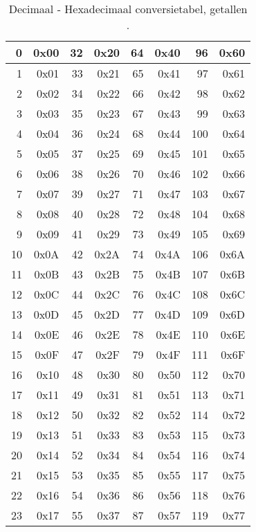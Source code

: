 \begin{table}[h!]
\caption{Decimaal - Hexadecimaal conversietabel, getallen .}
\label{tab:hexconv1}
\renewcommand{\arraystretch}{1.0}
\centering
\ttfamily
\begin{tabular}{|>{\color{red}}rr||>{\color{red}}rr||>{\color{red}}rr||>{\color{red}}rr|}
\hline
0 & 0x00 & 32 & 0x20 & 64 & 0x40 & 96 & 0x60 \\
\hline
1 & 0x01 & 33 & 0x21 & 65 & 0x41 & 97 & 0x61 \\
\hline
2 & 0x02 & 34 & 0x22 & 66 & 0x42 & 98 & 0x62 \\
\hline
3 & 0x03 & 35 & 0x23 & 67 & 0x43 & 99 & 0x63 \\
\hline
4 & 0x04 & 36 & 0x24 & 68 & 0x44 & 100 & 0x64 \\
\hline
5 & 0x05 & 37 & 0x25 & 69 & 0x45 & 101 & 0x65 \\
\hline
6 & 0x06 & 38 & 0x26 & 70 & 0x46 & 102 & 0x66 \\
\hline
7 & 0x07 & 39 & 0x27 & 71 & 0x47 & 103 & 0x67 \\
\hline
8 & 0x08 & 40 & 0x28 & 72 & 0x48 & 104 & 0x68 \\
\hline
9 & 0x09 & 41 & 0x29 & 73 & 0x49 & 105 & 0x69 \\
\hline
10 & 0x0A & 42 & 0x2A & 74 & 0x4A & 106 & 0x6A \\
\hline
11 & 0x0B & 43 & 0x2B & 75 & 0x4B & 107 & 0x6B \\
\hline
12 & 0x0C & 44 & 0x2C & 76 & 0x4C & 108 & 0x6C \\
\hline
13 & 0x0D & 45 & 0x2D & 77 & 0x4D & 109 & 0x6D \\
\hline
14 & 0x0E & 46 & 0x2E & 78 & 0x4E & 110 & 0x6E \\
\hline
15 & 0x0F & 47 & 0x2F & 79 & 0x4F & 111 & 0x6F \\
\hline
16 & 0x10 & 48 & 0x30 & 80 & 0x50 & 112 & 0x70 \\
\hline
17 & 0x11 & 49 & 0x31 & 81 & 0x51 & 113 & 0x71 \\
\hline
18 & 0x12 & 50 & 0x32 & 82 & 0x52 & 114 & 0x72 \\
\hline
19 & 0x13 & 51 & 0x33 & 83 & 0x53 & 115 & 0x73 \\
\hline
20 & 0x14 & 52 & 0x34 & 84 & 0x54 & 116 & 0x74 \\
\hline
21 & 0x15 & 53 & 0x35 & 85 & 0x55 & 117 & 0x75 \\
\hline
22 & 0x16 & 54 & 0x36 & 86 & 0x56 & 118 & 0x76 \\
\hline
23 & 0x17 & 55 & 0x37 & 87 & 0x57 & 119 & 0x77 \\

\end{tabular}
\end{table}
